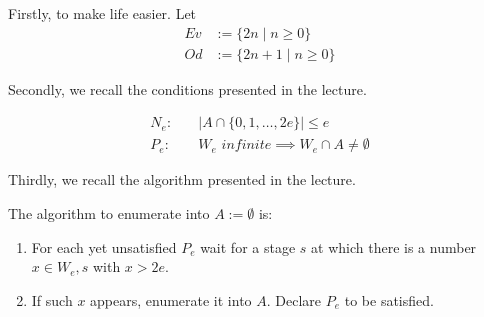 \documentclass[11pt,a4paper]{article}
\begin{document}
\begin{comment}
Before, we start I want to some intuitive attempts to generate such a set $S$ and explain why this attempt would fail.
I chose to do so, as I think that it provides an intuitive understanding of the algorithm, which actually constructs $S$.
Okay, firstly what happens if we take any simple set and add all odd numbers into it? Well then there would be the possibility 
that the resulting set is not simple, because for example $\overline{A}$ is not infinite.
Okay, what if I start with a set containing all odd numbers and I simply add elements into the set based on the algorithm presented in 
the lecture? Well it could be the case that I add every (or most) of the even numbers into my set, thus our complement would not be infinite. 
Ha, but this could easily be solved by only taking every second even number into the set. Well then the complement of our set would 
in the most inconvenient case be computable. Thus it must intersect with its complement, which obviously is a contradiction.
Okay, so you are saying that the complement of our set must contain only even numbers, but must contain enough even numbers such that it is still infinite, for example half of every even number, and that those numbers are chosen such that thy do not contain an infinite c.e. set? Yes that is exactly what we want. What are we waiting of, lets build the set.
\end{comment}

Firstly, to make life easier. Let
\begin{equation*}
\begin{split}
Ev &:= \{2n \mid n \geq 0\}  \\
Od &:= \{2n+1 \mid n \geq 0\}
\end{split}
\end{equation*}

Secondly, we recall the conditions presented in the lecture.

\begin{equation*}
\begin{split}
N_e: & \quad |A \cap \{0, 1, \ldots , 2e\}| \leq e \\
P_e: & \quad W_e \textit{ infinite} \implies W_e \cap A \neq \emptyset
\end{split}
\end{equation*}

Thirdly, we recall the algorithm presented in the lecture.

The algorithm to enumerate into $A:=\emptyset$ is:
\begin{enumerate}
\item For each yet unsatisfied $P_e$ wait for a stage $s$ at which there is a number $x \in W_e,s$ with $x > 2e$.
\item If such $x$ appears, enumerate it into $A$. Declare $P_e$ to be satisfied.
\end{enumerate}
\end{document}
